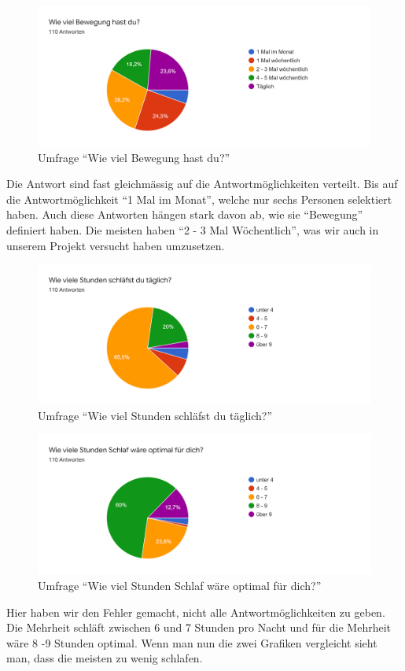 \begin{figure}[H]
  \centering
  \includegraphics[width=0.7\linewidth]{./images/umfrage_d.png}
  \caption{Umfrage “Wie viel Bewegung hast du?”}
  \label{fig:umfrage_d}
\end{figure}
Die Antwort sind fast gleichmässig auf die Antwortmöglichkeiten verteilt. Bis auf die Antwortmöglichkeit “1 Mal im Monat”, welche nur sechs Personen selektiert haben. Auch diese Antworten hängen stark davon ab, wie sie “Bewegung” definiert haben. Die meisten haben “2 - 3 Mal Wöchentlich”, was wir auch in unserem Projekt versucht haben umzusetzen.
\begin{figure}[H]
  \centering
  \includegraphics[width=0.7\linewidth]{./images/umfrage_e.png}
  \caption{Umfrage “Wie viel Stunden schläfst du täglich?”}
  \label{fig:umfrage_e}
\end{figure}
\begin{figure}[H]
  \centering
  \includegraphics[width=0.7\linewidth]{./images/umfrage_f.png}
  \caption{Umfrage “Wie viel Stunden Schlaf wäre optimal für dich?”}
  \label{fig:umfrage_f}
\end{figure}
Hier haben wir den Fehler gemacht, nicht alle Antwortmöglichkeiten zu geben.
\newline
Die Mehrheit schläft zwischen 6 und 7 Stunden pro Nacht und für die Mehrheit wäre 8 -9 Stunden optimal. Wenn man nun die zwei Grafiken vergleicht sieht man, dass die meisten zu wenig schlafen.
